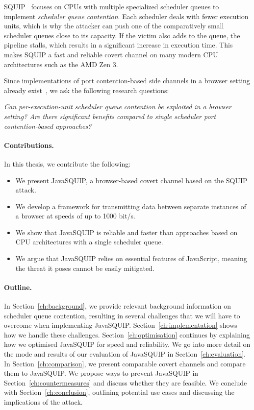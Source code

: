 \documentclass[11pt,
  titlepage=false,
  parskip=half,      %
]{scrreprt}
\begin{document}
SQUIP~\cite{squip} focuses on CPUs with multiple specialized scheduler queues to implement \textit{scheduler queue contention}.
Each scheduler deals with fewer execution units, which is why the attacker can push one of the comparatively small scheduler queues close to its capacity.
If the victim also adds to the queue, the pipeline stalls, which results in a significant increase in execution time.
This makes SQUIP a fast and reliable covert channel on many modern CPU architectures such as the AMD Zen 3.~\cite{squip}

Since implementations of port contention-based side channels in a browser setting already exist~\cite{Rokicki2022webport}, we ask the following research questions:

\textit{
    Can per-execution-unit scheduler queue contention be exploited in a browser setting?
    Are there significant benefits compared to single scheduler port contention-based approaches?
}

\pagebreak
\paragraph{Contributions.}
In this thesis, we contribute the following:
\begin{itemize}
    \item We present JavaSQUIP, a browser-based covert channel based on the SQUIP~\cite{squip} attack.
    \item We develop a framework for transmitting data between separate instances of a browser at speeds of up to 1000 bit/s.
    \item We show that JavaSQUIP is reliable and faster than approaches based on CPU architectures with a single scheduler queue.
    \item We argue that JavaSQUIP relies on essential features of JavaScript, meaning the threat it poses cannot be easily mitigated.
\end{itemize}

\paragraph{Outline.}
In Section~\ref{ch:background}, we provide relevant background information on scheduler queue contention,
resulting in several challenges that we will have to overcome when implementing JavaSQUIP.
Section~\ref{ch:implementation} shows how we handle these challenges.
Section~\ref{ch:optimisation} continues by explaining how we optimised JavaSQUIP for speed and reliability.
We go into more detail on the mode and results of our evaluation of JavaSQUIP in Section~\ref{ch:evaluation}.
In Section~\ref{ch:comparison}, we present comparable covert channels and compare them to JavaSQUIP.
We propose ways to prevent JavaSQUIP in Section~\ref{ch:countermeasures} and discuss whether they are feasible.
We conclude with Section~\ref{ch:conclusion}, outlining potential use cases and discussing the implications of the attack.
\end{document}
